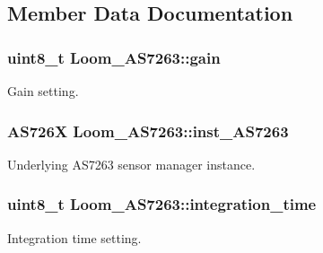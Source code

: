 \subsection{Member Data Documentation}
\subsubsection[{\texorpdfstring{gain}{gain}}]{\setlength{\rightskip}{0pt plus 5cm}uint8\+\_\+t Loom\+\_\+\+A\+S7263\+::gain\hspace{0.3cm}{\ttfamily [protected]}}\hypertarget{class_loom___a_s7263_ab9b7223697e11e9a0ee4aa3a207f9be5}{}\label{class_loom___a_s7263_ab9b7223697e11e9a0ee4aa3a207f9be5}


Gain setting. 

\subsubsection[{\texorpdfstring{inst\+\_\+\+A\+S7263}{inst_AS7263}}]{\setlength{\rightskip}{0pt plus 5cm}A\+S726X Loom\+\_\+\+A\+S7263\+::inst\+\_\+\+A\+S7263\hspace{0.3cm}{\ttfamily [protected]}}\hypertarget{class_loom___a_s7263_a653b51c97f1c478ae71ba4efc04f6f31}{}\label{class_loom___a_s7263_a653b51c97f1c478ae71ba4efc04f6f31}


Underlying A\+S7263 sensor manager instance. 

\subsubsection[{\texorpdfstring{integration\+\_\+time}{integration_time}}]{\setlength{\rightskip}{0pt plus 5cm}uint8\+\_\+t Loom\+\_\+\+A\+S7263\+::integration\+\_\+time\hspace{0.3cm}{\ttfamily [protected]}}\hypertarget{class_loom___a_s7263_a763628cf0f7a1d22a9c98776caa44112}{}\label{class_loom___a_s7263_a763628cf0f7a1d22a9c98776caa44112}


Integration time setting. 

